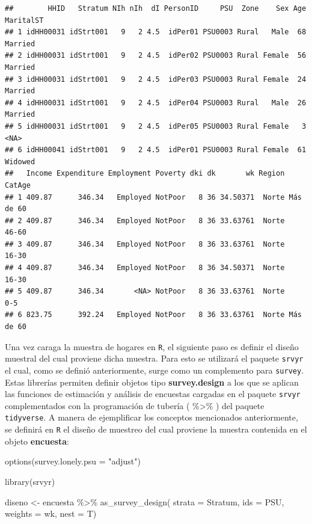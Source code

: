 \documentclass[
  12pt,
]{book}
\newenvironment{Shaded}{\begin{snugshade}}{\end{snugshade}}
\newcommand{\AttributeTok}[1]{\textcolor[rgb]{0.77,0.63,0.00}{#1}}
\newcommand{\FunctionTok}[1]{\textcolor[rgb]{0.00,0.00,0.00}{#1}}
\newcommand{\NormalTok}[1]{#1}
\newcommand{\OtherTok}[1]{\textcolor[rgb]{0.56,0.35,0.01}{#1}}
\newcommand{\SpecialCharTok}[1]{\textcolor[rgb]{0.00,0.00,0.00}{#1}}
\newcommand{\StringTok}[1]{\textcolor[rgb]{0.31,0.60,0.02}{#1}}
\begin{document}
\begin{verbatim}
##        HHID   Stratum NIh nIh  dI PersonID     PSU  Zone    Sex Age MaritalST
## 1 idHH00031 idStrt001   9   2 4.5  idPer01 PSU0003 Rural   Male  68   Married
## 2 idHH00031 idStrt001   9   2 4.5  idPer02 PSU0003 Rural Female  56   Married
## 3 idHH00031 idStrt001   9   2 4.5  idPer03 PSU0003 Rural Female  24   Married
## 4 idHH00031 idStrt001   9   2 4.5  idPer04 PSU0003 Rural   Male  26   Married
## 5 idHH00031 idStrt001   9   2 4.5  idPer05 PSU0003 Rural Female   3      <NA>
## 6 idHH00041 idStrt001   9   2 4.5  idPer01 PSU0003 Rural Female  61   Widowed
##   Income Expenditure Employment Poverty dki dk       wk Region    CatAge
## 1 409.87      346.34   Employed NotPoor   8 36 34.50371  Norte Más de 60
## 2 409.87      346.34   Employed NotPoor   8 36 33.63761  Norte     46-60
## 3 409.87      346.34   Employed NotPoor   8 36 33.63761  Norte     16-30
## 4 409.87      346.34   Employed NotPoor   8 36 34.50371  Norte     16-30
## 5 409.87      346.34       <NA> NotPoor   8 36 33.63761  Norte       0-5
## 6 823.75      392.24   Employed NotPoor   8 36 33.63761  Norte Más de 60
\end{verbatim}

Una vez caraga la muestra de hogares en \texttt{R}, el siguiente paso es definir el diseño muestral del cual proviene dicha muestra. Para esto se utilizará el paquete \texttt{srvyr} el cual, como se definió anteriormente, surge como un complemento para \texttt{survey}. Estas librerías permiten definir objetos tipo \textbf{survey.design} a los que se aplican las funciones de estimación y análisis de encuestas cargadas en el paquete \texttt{srvyr} complementados con la programación de tubería ( \%\textgreater\% ) del paquete \texttt{tidyverse}. A manera de ejemplificar los conceptos mencionados anteriormente, se definirá en \texttt{R} el diseño de muestreo del cual proviene la muestra contenida en el objeto \textbf{encuesta}:

\begin{Shaded}
\begin{Highlighting}[]
\FunctionTok{options}\NormalTok{(}\AttributeTok{survey.lonely.psu =} \StringTok{"adjust"}\NormalTok{) }

\FunctionTok{library}\NormalTok{(srvyr)}

\NormalTok{diseno }\OtherTok{\textless{}{-}}\NormalTok{ encuesta }\SpecialCharTok{\%\textgreater{}\%} 
  \FunctionTok{as\_survey\_design}\NormalTok{(}
    \AttributeTok{strata =}\NormalTok{ Stratum,  }
    \AttributeTok{ids =}\NormalTok{ PSU,        }
    \AttributeTok{weights =}\NormalTok{ wk,      }
    \AttributeTok{nest =}\NormalTok{ T)}
\end{Highlighting}
\end{Shaded}
\end{document}
